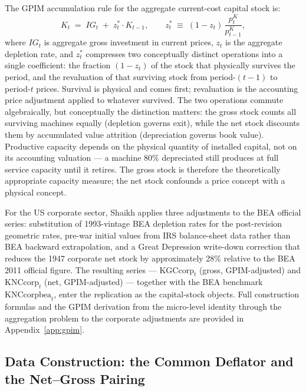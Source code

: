 \documentclass[11pt,a4paper]{article}
\begin{document}
The GPIM accumulation rule for the aggregate current-cost capital stock is:
%
\begin{equation}
	\label{eq:gpim_accumulation}
	K_t \;=\; IG_t \;+\; z_t^{\ast} \cdot K_{t-1},
	\qquad
	z_t^{\ast} \;\equiv\; (1 - z_t)\,\frac{p_t^K}{p_{t-1}^K},
\end{equation}
%
where $IG_t$ is aggregate gross investment in current prices, $z_t$ is the
aggregate depletion rate, and $z_t^{\ast}$ compresses two conceptually
distinct operations into a single coefficient: the fraction $(1 - z_t)$ of
the stock that physically survives the period, and the revaluation of
that surviving stock from period-$(t-1)$ to period-$t$ prices. Survival is
physical and comes first; revaluation is the accounting price adjustment
applied to whatever survived. The two operations commute algebraically, but
conceptually the distinction matters: the gross stock counts all surviving
machines equally (depletion governs exit), while the net stock discounts
them by accumulated value attrition (depreciation governs book value).
Productive capacity depends on the physical quantity of installed capital,
not on its accounting valuation --- a machine 80\% depreciated still
produces at full service capacity until it retires. The gross stock is
therefore the theoretically appropriate capacity measure; the net stock
confounds a price concept with a physical concept.

For the US corporate sector, Shaikh applies three adjustments to the BEA
official series: substitution of 1993-vintage BEA depletion rates for the
post-revision geometric rates, pre-war initial values from IRS balance-sheet
data rather than BEA backward extrapolation, and a Great Depression
write-down correction that reduces the 1947 corporate net stock by
approximately 28\% relative to the BEA 2011 official figure. The resulting
series --- $\text{KGCcorp}_t$ (gross, GPIM-adjusted) and
$\text{KNCcorp}_t$ (net, GPIM-adjusted) --- together with the BEA benchmark
$\text{KNCcorpbea}_t$, enter the replication as the capital-stock objects.
Full construction formulas and the GPIM derivation from the micro-level
identity through the aggregation problem to the corporate adjustments are
provided in Appendix~\ref{app:gpim}.



\subsection{Data Construction: the Common Deflator and the Net--Gross
Pairing}
\label{subsec:data_pairing}
\end{document}
